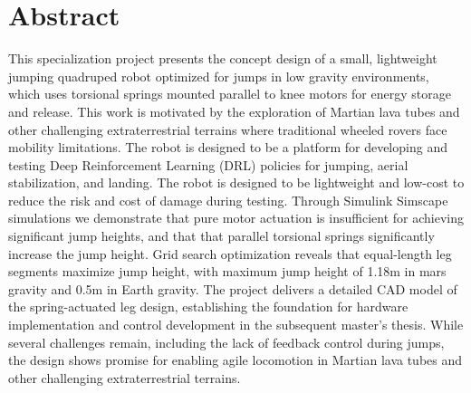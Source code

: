 
\section*{Abstract}

This specialization project presents the concept design of a small, lightweight jumping quadruped robot optimized for jumps in low gravity environments, which uses torsional springs mounted parallel to knee motors for energy storage and release. This work is motivated by the exploration of Martian lava tubes and other challenging extraterrestrial terrains where traditional wheeled rovers face mobility limitations. The robot is designed to be a platform for developing and testing Deep Reinforcement Learning (DRL) policies for jumping, aerial stabilization, and landing. The robot is designed to be lightweight and low-cost to reduce the risk and cost of damage during testing. Through Simulink Simscape simulations we demonstrate that pure motor actuation is insufficient for achieving significant jump heights, and that that parallel torsional springs significantly increase the jump height. Grid search optimization reveals that equal-length leg segments maximize jump height, with maximum jump height of 1.18m in mars gravity and 0.5m in Earth gravity. The project delivers a detailed CAD model of the spring-actuated leg design, establishing the foundation for hardware implementation and control development in the subsequent master's thesis. While several challenges remain, including the lack of feedback control during jumps, the design shows promise for enabling agile locomotion in Martian lava tubes and other challenging extraterrestrial terrains.



